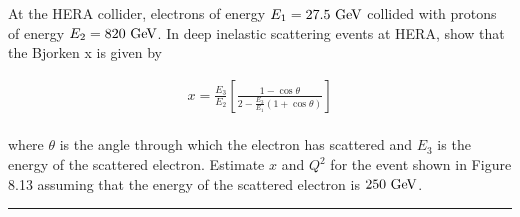 \begin{problem}{8.8}
At the HERA collider, electrons of energy $E_1 = 27.5 \text{ GeV}$ collided with protons of energy $E_2 = 820 \text{ GeV}$. In deep inelastic scattering events at HERA, show that the Bjorken x is given by

\begin{align*}
    x = \frac{E_3}{E_2} \left[ \frac{1-\cos\theta}{2-\frac{E_3}{E_1}\left(1+\cos\theta\right)} \right]
\end{align*}\\
where $\theta$ is the angle through which the electron has scattered and $E_3$ is the energy of the scattered electron. Estimate $x$ and $Q^2$ for the event shown in Figure 8.13 assuming that the energy of the scattered electron is $250 \text{ GeV}$.
\end{problem}
\begin{solution}

\end{solution}

\noindent\rule{7in}{1.5pt}

